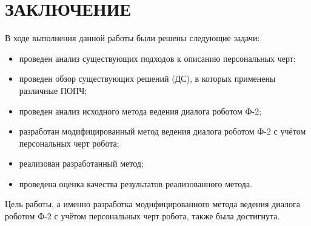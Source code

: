 \chapter*{ЗАКЛЮЧЕНИЕ}

В ходе выполнения данной работы были решены следующие задачи:

\begin{itemize}
	\item проведен анализ существующих подходов к описанию персональных черт;

	\item проведен обзор существующих решений (ДС), в которых применены различные ПОПЧ;

	\item проведен анализ исходного метода ведения диалога роботом Ф-2;

	\item разработан модифицированный метод ведения диалога роботом Ф-2 с учётом персональных черт робота;

	\item реализован разработанный метод;

	\item проведена оценка качества результатов реализованного метода.

\end{itemize}

Цель работы, а именно разработка модифицированного метода ведения диалога роботом Ф-2 с учётом персональных черт робота, также была достигнута.

 